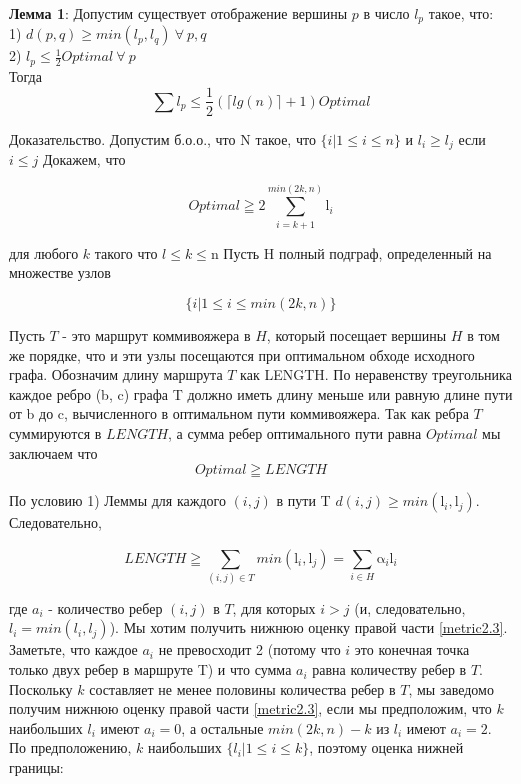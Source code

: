 \documentclass[a4paper, 14pt]{extarticle}
\begin{document}
\textbf{Лемма 1}: Допустим существует отображение вершины $p$ в число $l_p$ такое, что:\\
1) $d(p,q) \geq min(l_p, l_q) \: \forall \: p,q$\\
2) $l_p \leq \frac{1}{2}Optimal\: \forall \: p $\\
Тогда 
\begin{equation}
\sum l_p \leq \frac{1}{2}(\lceil lg(n)\rceil+1)Optimal
\end{equation}

Доказательство.
Допустим б.о.о., что N такое, что  $\{i|1 \leq i \leq n \}$  и $l_i \geq l_j$ если $i \leq j$
Докажем, что 

\begin{equation}\label{metriclowerbound}
	{Optimal} \geqq 2\sum_{i=k+1}^{min(2k,n)}\mathrm{l}_i
\end{equation}

для любого $k$ такого что $l \leq k \leq $n
Пусть H полный подграф, определенный на множестве узлов

\begin{equation}
	{\{i|1 \leq i \leq min(2k, n)\}}
\end{equation}

Пусть $T$ - это маршрут коммивояжера в $H$, который посещает вершины $H$ в том же порядке, что и эти узлы посещаются при оптимальном обходе исходного графа. Обозначим длину маршрута $T$ как LENGTH. По неравенству треугольника каждое ребро (b, c) графа T должно иметь длину меньше или равную длине пути от b до c, вычисленного в оптимальном пути коммивояжера. Так как ребра $T$ суммируются в $LENGTH$, а сумма ребер оптимального пути равна $Optimal$ мы заключаем что
\begin{equation}
	{Optimal} \geqq {LENGTH}
\end{equation}

По условию 1) Леммы для каждого $(i, j)$ в пути T  $d (i, j)\geq min (\mathrm{l}_i, \mathrm{l}_j)$. Следовательно,

\begin{equation}\label{metric2.3}
	{LENGTH} \geqq \sum_{(i,j)\in T}^{}min(\mathrm{l}_i,\mathrm{l}_j ) = \sum_{i\in H}^{} \mathrm{\alpha}_i\mathrm{l}_i
\end{equation}

где $a_i$ - количество ребер $(i, j)$ в $T$, для которых $i > j$ (и, следовательно, $l_i=min(l_i, l_j)$).
Мы хотим получить нижнюю оценку правой части \eqref{metric2.3}. Заметьте, что каждое $a_i$ не превосходит 2 (потому что $i$ это конечная точка только двух ребер в маршруте T) и что сумма $a_i$ равна количеству ребер в $T$. Поскольку $k$ составляет не менее половины количества ребер в $T$, мы заведомо получим нижнюю оценку правой части \eqref{metric2.3}, если мы предположим, что $k$ наибольших $l_i$ имеют $a_i=0$, а остальные $min (2k, n) - k$ из $l_i$ имеют $a_i= 2$. По предположению, $k$ наибольших $\{ l_i|1 \leq i \leq k\}$, поэтому оценка нижней границы:
\end{document}

